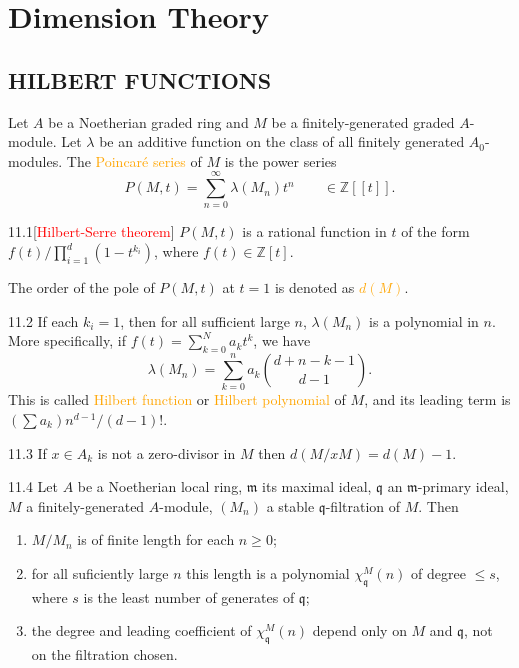 \chapter{Dimension Theory}

\section*{HILBERT FUNCTIONS}

Let $A$ be a Noetherian graded ring and $M$ be a finitely-generated graded $A$-module. Let $\lambda$ be an additive function on the class of all finitely generated $A_0$-modules. The \textcolor{orange}{Poincar\'{e} series} of $M$ is the power series
\begin{equation*}
	P(M,t)=\sum_{n=0}^\infty\lambda\left(M_n\right)t^n\qquad\in\mathbb{Z}[[t]].
\end{equation*}

\begin{theorem}{11.1}[\textcolor{red}{Hilbert-Serre theorem}]
	$P(M,t)$ is a rational function in $t$ of the form $f(t)/\prod_{i=1}^d\left(1-t^{k_i}\right)$, where $f(t)\in\mathbb{Z}[t]$.
\end{theorem}

The order of the pole of $P(M,t)$ at $t=1$ is denoted as \textcolor{orange}{$d(M)$}.

\begin{corollary}{11.2}
	If each $k_i=1$, then for all sufficient large $n$, $\lambda\left(M_n\right)$ is a polynomial in $n$. More specifically, if $f(t)=\sum_{k=0}^Na_kt^k$, we have
	\begin{equation*}
		\lambda\left(M_n\right)=\sum_{k=0}^na_k\binom{d+n-k-1}{d-1}.
	\end{equation*}
	This is called \textcolor{orange}{Hilbert function} or \textcolor{orange}{Hilbert polynomial} of $M$, and its leading term is $\left(\sum a_k\right)n^{d-1}/(d-1)!$.
\end{corollary}

\begin{proposition}{11.3}
	If $x\in A_k$ is not a zero-divisor in $M$ then $d(M/xM)=d(M)-1$.
\end{proposition}

\begin{proposition}{11.4}
	Let $A$ be a Noetherian local ring, $\mathfrak{m}$ its maximal ideal, $\mathfrak{q}$ an $\mathfrak{m}$-primary ideal, $M$ a finitely-generated $A$-module, $\left(M_n\right)$ a stable $\mathfrak{q}$-filtration of $M$. Then
	\begin{enumerate}[label=\textup{(\roman*)}]
		\item $M/M_n$ is of finite length for each $n\geqslant0$;
		\item for all suficiently large $n$ this length is a polynomial $\chi_\mathfrak{q}^M(n)$ of degree $\leqslant s$, where $s$ is the least number of generates of $\mathfrak{q}$;
		\item the degree and leading coefficient of $\chi_\mathfrak{q}^M(n)$ depend only on $M$ and $\mathfrak{q}$, not on the filtration chosen.
	\end{enumerate}
\end{proposition}

